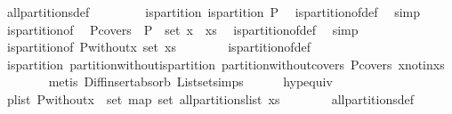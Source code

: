 \begin{isabellebody}
\ all{\isacharunderscore}partitions{\isacharunderscore}def\ \isacommand{{\isachardot}{\isachardot}}\isamarkupfalse%
\isanewline
\ \ \ \ \isamarkupfalse%
\ \isamarkupfalse%
\ is{\isacharunderscore}partition{\isacharcolon}\ {\isachardoublequoteopen}is{\isacharunderscore}partition\ P{\isachardoublequoteclose}\ \isamarkupfalse%
\ is{\isacharunderscore}partition{\isacharunderscore}of{\isacharunderscore}def\ \isamarkupfalse%
\ simp\isanewline
\ \ \ \ \isamarkupfalse%
\ is{\isacharunderscore}partition{\isacharunderscore}of\ \isamarkupfalse%
\ P{\isacharunderscore}covers{\isacharcolon}\ {\isachardoublequoteopen}{\isasymUnion}\ P\ {\isacharequal}\ set\ {\isacharparenleft}x\ {\isacharhash}\ xs{\isacharparenright}{\isachardoublequoteclose}\ \isamarkupfalse%
\ is{\isacharunderscore}partition{\isacharunderscore}of{\isacharunderscore}def\ \isamarkupfalse%
\ simp\isanewline
\isanewline
\ \ \ \ \isamarkupfalse%
\ {\isachardoublequoteopen}is{\isacharunderscore}partition{\isacharunderscore}of\ {\isacharquery}P{\isacharunderscore}without{\isacharunderscore}x\ {\isacharparenleft}set\ xs{\isacharparenright}{\isachardoublequoteclose}\isanewline
\ \ \ \ \ \ \isamarkupfalse%
\ is{\isacharunderscore}partition{\isacharunderscore}of{\isacharunderscore}def\isanewline
\ \ \ \ \ \ \isamarkupfalse%
\ is{\isacharunderscore}partition\ partition{\isacharunderscore}without{\isacharunderscore}is{\isacharunderscore}partition\ partition{\isacharunderscore}without{\isacharunderscore}covers\ P{\isacharunderscore}covers\ x{\isacharunderscore}notin{\isacharunderscore}xs\isanewline
\ \ \ \ \ \ \isamarkupfalse%
\ {\isacharparenleft}metis\ Diff{\isacharunderscore}insert{\isacharunderscore}absorb\ List{\isachardot}set{\isacharunderscore}simps{\isacharparenleft}{}{\isacharparenright}{\isacharparenright}\isanewline
\ \ \ \ \isamarkupfalse%
\ hyp{\isacharunderscore}equiv\ \isamarkupfalse%
\ p{\isacharunderscore}list{\isacharcolon}\ {\isachardoublequoteopen}{\isacharquery}P{\isacharunderscore}without{\isacharunderscore}x\ {\isasymin}\ set\ {\isacharparenleft}map\ set\ {\isacharparenleft}all{\isacharunderscore}partitions{\isacharunderscore}list\ xs{\isacharparenright}{\isacharparenright}{\isachardoublequoteclose}\isanewline
\ \ \ \ \ \ \isamarkupfalse%
\ all{\isacharunderscore}partitions{\isacharunderscore}def\ \isamarkupfalse%

\end{isabellebody}
